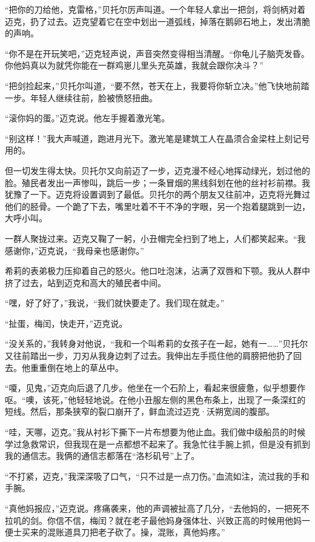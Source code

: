 \documentclass[AutoFakeBold=true]{book}
\begin{document}
``把你的刀给他，克雷格，''贝托尔厉声叫道。一个年轻人拿出一把剑，将剑柄对着迈克，扔了过去。迈克望着它在空中划出一道弧线，掉落在鹅卵石地上，发出清脆的声响。

``你不是在开玩笑吧，''迈克轻声说，声音突然变得相当清醒。``你龟儿子脑壳发昏。你他妈真以为就凭你能在一群鸡崽儿里头充英雄，我就会跟你决斗？''

``把剑捡起来，''贝托尔叫道，``要不然，苍天在上，我要将你斩立决。''他飞快地前踏一步。年轻人继续往前，脸被愤怒扭曲。

``滚你妈的蛋。''迈克说。他左手握着激光笔。

``别这样！''我大声喊道，跑进月光下。激光笔是建筑工人在晶须合金梁柱上刻记号用的。

但一切发生得太快。贝托尔又向前迈了一步，迈克漫不经心地挥动绿光，划过他的脸。殖民者发出一声惨叫，跳后一步；一条冒烟的黑线斜划在他的丝衬衫前襟。我犹豫了一下。迈克将设置调到了最低。贝托尔的两个朋友又往前冲，迈克将光舞过他们的胫骨。一个跪了下去，嘴里吐着不干不净的字眼，另一个抱着腿跳到一边，大呼小叫。

一群人聚拢过来。迈克又鞠了一躬，小丑帽完全扫到了地上，人们都笑起来。``我感谢你，''迈克说，``我母亲也感谢你。''

希莉的表弟极力压抑着自己的怒火。他口吐泡沫，沾满了双唇和下颚。我从人群中挤了过去，站到迈克和高大的殖民者中间。

``嘿，好了好了，''我说，``我们就快要走了。我们现在就走。''

``扯蛋，梅闰，快走开，''迈克说。

``没关系的，''我转身对他说，``我和一个叫希莉的女孩子在一起，她有一……''贝托尔又往前踏出一步，刀刃从我身边刺了过去。我伸出左手揽住他的肩膀把他扔了回去。他重重倒在地上的草丛中。

``嗄，见鬼，''迈克向后退了几步。他坐在一个石阶上，看起来很疲惫，似乎想要作呕。``噢，该死，''他轻轻地说。在他小丑服左侧的黑色布条上，出现了一条深红的短线。然后，那条狭窄的裂口崩开了，鲜血流过迈克·沃朔宽阔的腹部。

``哇，天哪，迈克。''我从衬衫下撕下一片布想要为他止血。我们做中级船员的时候学过急救常识，但我现在是一点都想不起来了。我急忙往手腕上抓，但是没有抓到我的通信志。我俩的通信志都落在``洛杉矶号''上了。

``不打紧，迈克，''我深深吸了口气，``只不过是一点刀伤。''血流如注，流过我的手和手腕。

``真他妈报应，''迈克说。疼痛袭来，他的声调被扯高了几分，``去他妈的，一把死不拉叽的剑。你信不信，梅闰？就在老子最他妈身强体壮、兴致正高的时候用他妈一便士买来的混账道具刀把老子砍了。操，混账，真他妈疼。''
\end{document}
